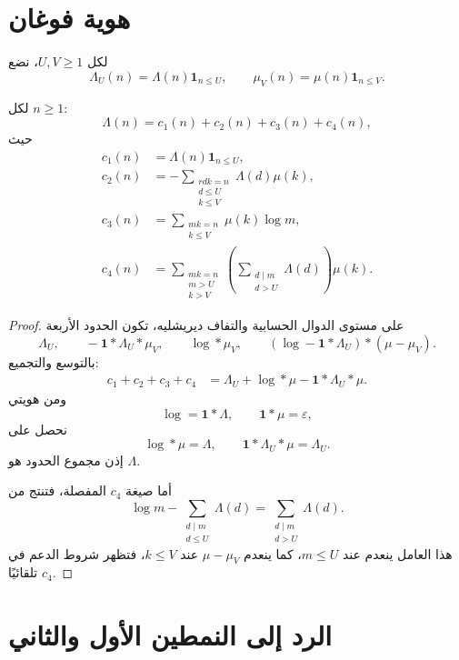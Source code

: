 \section{هوية فوغان}

لكل \(U,V\ge1\)، نضع
\[
\Lambda_U(n)=\Lambda(n)\mathbf1_{n\le U},
\qquad
\mu_V(n)=\mu(n)\mathbf1_{n\le V}.
\]

\begin{lemma}
\label{lem:chapter13-vaughan-identity}
\provedhere
لكل \(n\ge1\):
\[
\Lambda(n)=c_1(n)+c_2(n)+c_3(n)+c_4(n),
\tag{13.4}
\]
حيث
\begin{align*}
c_1(n)
&=\Lambda(n)\mathbf1_{n\le U},\\
c_2(n)
&=-\sum_{\substack{rdk=n\\d\le U\\k\le V}}
\Lambda(d)\mu(k),\\
c_3(n)
&=\sum_{\substack{mk=n\\k\le V}}
\mu(k)\log m,\\
c_4(n)
&=\sum_{\substack{mk=n\\m>U\\k>V}}
\left(\sum_{\substack{d\mid m\\d>U}}\Lambda(d)\right)
\mu(k).
\end{align*}
\end{lemma}

\begin{proof}
على مستوى الدوال الحسابية والتفاف ديريشليه، تكون الحدود الأربعة
\[
\Lambda_U,
\qquad
-\mathbf1*\Lambda_U*\mu_V,
\qquad
\log*\mu_V,
\qquad
(\log-\mathbf1*\Lambda_U)*(\mu-\mu_V).
\]
بالتوسع والتجميع:
\begin{align*}
c_1+c_2+c_3+c_4
&=
\Lambda_U+\log*\mu-\mathbf1*\Lambda_U*\mu.
\end{align*}
ومن هويتي
\[
\log=\mathbf1*\Lambda,
\qquad
\mathbf1*\mu=\varepsilon,
\]
نحصل على
\[
\log*\mu=\Lambda,
\qquad
\mathbf1*\Lambda_U*\mu=\Lambda_U.
\]
إذن مجموع الحدود هو \(\Lambda\).

أما صيغة \(c_4\) المفصلة، فتنتج من
\[
\log m-
\sum_{\substack{d\mid m\\d\le U}}\Lambda(d)
=
\sum_{\substack{d\mid m\\d>U}}\Lambda(d).
\]
هذا العامل ينعدم عند \(m\le U\)، كما ينعدم \(\mu-\mu_V\) عند \(k\le V\)،
فتظهر شروط الدعم في \(c_4\) تلقائيًا.
\end{proof}

\section{الرد إلى النمطين الأول والثاني}

